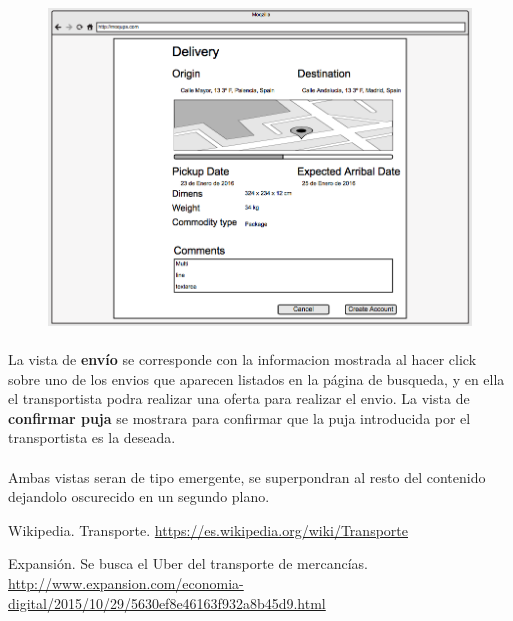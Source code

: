 \documentclass[10pt, a4paper,spanish]{article}
\begin{document}
			\begin{figure}[H]
				\centering
				\begin{minipage}[b]{0.7\textwidth}
					\includegraphics[width=\textwidth]{res/sketch_delivery.png}

				\end{minipage}
			\end{figure}

			\paragraph{}
			La vista de \textbf{envío} se corresponde con la informacion mostrada al hacer click sobre uno de los envios que aparecen listados en la página de busqueda, y en ella el transportista podra realizar una oferta para realizar el envio. La vista de \textbf{confirmar puja} se mostrara para confirmar que la puja introducida por el transportista es la deseada.
			
			\paragraph{}
			Ambas vistas seran de tipo emergente, se superpondran al resto del contenido dejandolo oscurecido en un segundo plano.
	\begin{thebibliography}{9}

		Wikipedia. Transporte. \url{https://es.wikipedia.org/wiki/Transporte}

		Expansión. Se busca el Uber del transporte de mercancías. \url{http://www.expansion.com/economia-digital/2015/10/29/5630ef8e46163f932a8b45d9.html}

	\end{thebibliography}
\end{document}
